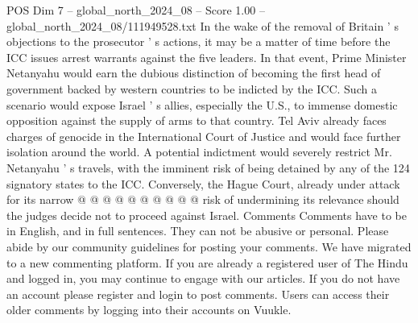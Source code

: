 \begin{textsample}{POS Dim 7 – global\_north\_2024\_08 – Score 1.00 – global\_north\_2024\_08/111949528.txt}
In the wake of the removal of Britain ' s objections to the prosecutor ' s actions, it may be a matter of time before the ICC issues arrest warrants against the five leaders.
In that event, Prime Minister Netanyahu would earn the dubious distinction of becoming the first head of government backed by western countries to be indicted by the ICC.
Such a scenario would expose Israel ' s allies, especially the U.S., to immense domestic opposition against the supply of arms to that country.
Tel Aviv already faces charges of genocide in the International Court of Justice and would face further isolation around the world.
A potential indictment would severely restrict Mr.
Netanyahu ' s travels, with the imminent risk of being detained by any of the 124 signatory states to the ICC.
Conversely, the Hague Court, already under attack for its narrow @ @ @ @ @ @ @ @ @ @ risk of undermining its relevance should the judges decide not to proceed against Israel.
Comments Comments have to be in English, and in full sentences.
They can not be abusive or personal.
Please abide by our community guidelines for posting your comments.
We have migrated to a new commenting platform.
If you are already a registered user of The Hindu and logged in, you may continue to engage with our articles.
If you do not have an account please register and login to post comments.
Users can access their older comments by logging into their accounts on Vuukle.

\end{textsample}
